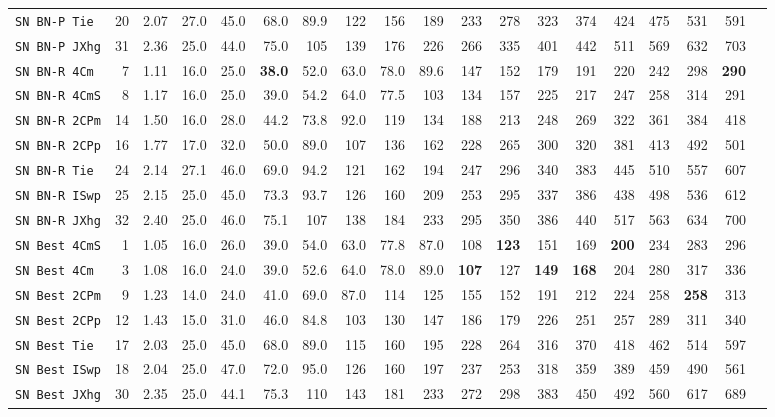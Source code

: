 \begin{tabular}{l | r @{~~} r | r@{~~}r@{~~}r@{~~}r@{~~}r@{~~}r@{~~}r@{~~}r@{~~}r@{~~}r@{~~}r@{~~}r@{~~}r@{~~}r@{~~}r@{~~}r|}
\verb+SN BN-P Tie + & 20 & 2.07 & 27.0&45.0&68.0&89.9&122&156&189&233&278&323&374&424&475&531&591\\
\verb+SN BN-P JXhg+ & 31 & 2.36 & 25.0&44.0&75.0&105&139&176&226&266&335&401&442&511&569&632&703\smallskip \\
\verb+SN BN-R 4Cm + & 7 & 1.11 & 16.0&25.0&\textbf{38.0}&52.0&63.0&78.0&89.6&147&152&179&191&220&242&298&\textbf{290}\\
\verb+SN BN-R 4CmS+ & 8 & 1.17 & 16.0&25.0&39.0&54.2&64.0&77.5&103&134&157&225&217&247&258&314&291\\
\verb+SN BN-R 2CPm+ & 14 & 1.50 & 16.0&28.0&44.2&73.8&92.0&119&134&188&213&248&269&322&361&384&418\\
\verb+SN BN-R 2CPp+ & 16 & 1.77 & 17.0&32.0&50.0&89.0&107&136&162&228&265&300&320&381&413&492&501\\
\verb+SN BN-R Tie + & 24 & 2.14 & 27.1&46.0&69.0&94.2&121&162&194&247&296&340&383&445&510&557&607\\
\verb+SN BN-R ISwp+ & 25 & 2.15 & 25.0&45.0&73.3&93.7&126&160&209&253&295&337&386&438&498&536&612\\
\verb+SN BN-R JXhg+ & 32 & 2.40 & 25.0&46.0&75.1&107&138&184&233&295&350&386&440&517&563&634&700\smallskip \\
\verb+SN Best 4CmS+ & 1 & 1.05 & 16.0&26.0&39.0&54.0&63.0&77.8&87.0&108&\textbf{123}&151&169&\textbf{200}&234&283&296\\
\verb+SN Best 4Cm + & 3 & 1.08 & 16.0&24.0&39.0&52.6&64.0&78.0&89.0&\textbf{107}&127&\textbf{149}&\textbf{168}&204&280&317&336\\
\verb+SN Best 2CPm+ & 9 & 1.23 & 14.0&24.0&41.0&69.0&87.0&114&125&155&152&191&212&224&258&\textbf{258}&313\\
\verb+SN Best 2CPp+ & 12 & 1.43 & 15.0&31.0&46.0&84.8&103&130&147&186&179&226&251&257&289&311&340\\
\verb+SN Best Tie + & 17 & 2.03 & 25.0&45.0&68.0&89.0&115&160&195&228&264&316&370&418&462&514&597\\
\verb+SN Best ISwp+ & 18 & 2.04 & 25.0&47.0&72.0&95.0&126&160&197&237&253&318&359&389&459&490&561\\
\verb+SN Best JXhg+ & 30 & 2.35 & 25.0&44.1&75.3&110&143&181&233&272&298&383&450&492&560&617&689\\
\end{tabular}
